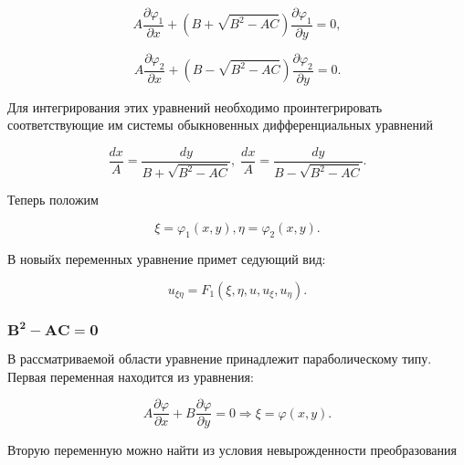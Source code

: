 	        \begin{equation}
	            A \frac{\partial \varphi_{1}}{\partial x} + \left( B + \sqrt{B^{2} - A C} \right) \frac{\partial \varphi_{1}}{\partial y} = 0,
	        \end{equation}

	        \begin{equation}
	            A \frac{\partial \varphi_{2}}{\partial x} + \left( B - \sqrt{B^{2} - A C} \right) \frac{\partial \varphi_{2}}{\partial y} = 0.
	        \end{equation}

	        Для интегрирования этих уравнений необходимо проинтегрировать соответствующие им системы обыкновенных дифференциальных уравнений

	        \begin{equation}
		        \frac{d x}{A} = \frac{dy}{B + \sqrt{B^{2} - A C}}, \; \frac{d x}{A} = \frac{dy}{B - \sqrt{B^{2} - A C}}.
	        \end{equation}

	        Теперь положим

	        \begin{equation}
		        \xi = \varphi_{1} \left( x, y \right), \eta = \varphi_{2} \left( x, y \right).
	        \end{equation}

			В новыйх переменных уравнение примет седующий вид:

			\begin{equation}
				u_{\xi \eta} = F_{1} \left( \xi, \eta, u, u_{\xi}, u_{\eta} \right).
			\end{equation}

		\subsubsection*{$\mathbf{B^{2} - AC = 0}$}

			В рассматриваемой области уравнение принадлежит параболическому типу.\\

			Первая переменная находится из уравнения:

			\begin{equation}
				A \frac{\partial \varphi}{\partial x} + B \frac{\partial \varphi}{\partial y} = 0 \Rightarrow \xi = \varphi \left( x, y \right).
			\end{equation}

			Вторую переменную можно найти из условия невырожденности преобразования

